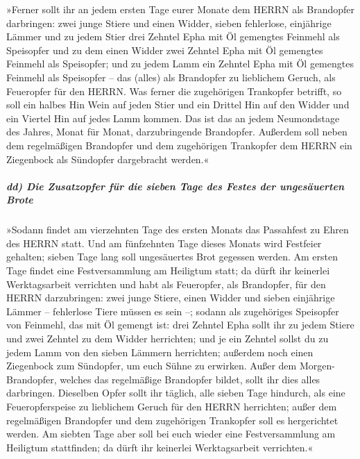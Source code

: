 »Ferner sollt ihr an jedem ersten Tage eurer Monate dem
HERRN als Brandopfer darbringen: zwei junge Stiere und einen Widder,
sieben fehlerlose, einjährige Lämmer und zu jedem Stier
drei Zehntel Epha mit Öl gemengtes Feinmehl als Speisopfer und zu dem
einen Widder zwei Zehntel Epha mit Öl gemengtes Feinmehl als Speisopfer;
und zu jedem Lamm ein Zehntel Epha mit Öl gemengtes
Feinmehl als Speisopfer -- das (alles) als Brandopfer zu lieblichem
Geruch, als Feueropfer für den HERRN. Was ferner die
zugehörigen Trankopfer betrifft, so soll ein halbes Hin Wein auf jeden
Stier und ein Drittel Hin auf den Widder und ein Viertel Hin auf jedes
Lamm kommen. Das ist das an jedem Neumondstage des Jahres, Monat für
Monat, darzubringende Brandopfer. Außerdem soll neben dem
regelmäßigen Brandopfer und dem zugehörigen Trankopfer dem HERRN ein
Ziegenbock als Sündopfer dargebracht werden.«

\hypertarget{dd-die-zusatzopfer-fuxfcr-die-sieben-tage-des-festes-der-ungesuxe4uerten-brote}{%
\subparagraph{dd) Die Zusatzopfer für die sieben Tage des Festes der
ungesäuerten
Brote}\label{dd-die-zusatzopfer-fuxfcr-die-sieben-tage-des-festes-der-ungesuxe4uerten-brote}}

»Sodann findet am vierzehnten Tage des ersten Monats das
Passahfest zu Ehren des HERRN statt. Und am fünfzehnten
Tage dieses Monats wird Festfeier gehalten; sieben Tage lang soll
ungesäuertes Brot gegessen werden. Am ersten Tage findet
eine Festversammlung am Heiligtum statt; da dürft ihr keinerlei
Werktagsarbeit verrichten und habt als Feueropfer, als
Brandopfer, für den HERRN darzubringen: zwei junge Stiere, einen Widder
und sieben einjährige Lämmer -- fehlerlose Tiere müssen es sein --;
sodann als zugehöriges Speisopfer von Feinmehl, das mit
Öl gemengt ist: drei Zehntel Epha sollt ihr zu jedem Stiere und zwei
Zehntel zu dem Widder herrichten; und je ein Zehntel
sollst du zu jedem Lamm von den sieben Lämmern herrichten;
außerdem noch einen Ziegenbock zum Sündopfer, um euch
Sühne zu erwirken. Außer dem Morgen-Brandopfer, welches
das regelmäßige Brandopfer bildet, sollt ihr dies alles darbringen.
Dieselben Opfer sollt ihr täglich, alle sieben Tage
hindurch, als eine Feueropferspeise zu lieblichem Geruch für den HERRN
herrichten; außer dem regelmäßigen Brandopfer und dem zugehörigen
Trankopfer soll es hergerichtet werden. Am siebten Tage
aber soll bei euch wieder eine Festversammlung am Heiligtum stattfinden;
da dürft ihr keinerlei Werktagsarbeit verrichten.«

